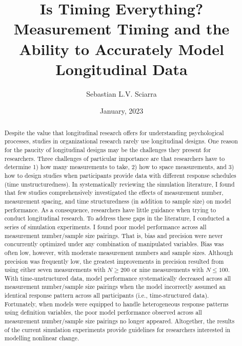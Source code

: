 \documentclass[
12pt, %
twoside,
english]{guelphthesis}
\title{Is Timing Everything? Measurement Timing and the Ability to Accurately Model Longitudinal Data}
\author{Sebastian L.V. Sciarra}
\date{January, 2023}
\let\cleardoublepage\clearpage
\let\oldfrontmatter\frontmatter
\renewcommand{\frontmatter}{
  \oldfrontmatter
  
  
   \pagestyle{frontmatter} %
}
\begin{document}
\frontmatter %

  \maketitle

\setcounter{page}{2} %

\cleardoublepage
\thispagestyle{empty} %
  \begin{abstract}{2}{Despite the value that longitudinal research offers for understanding psychological processes, studies in organizational research rarely use longitudinal designs. One reason for the paucity of longitudinal designs may be the challenges they present for researchers. Three challenges of particular importance are that researchers have to determine 1) how many measurements to take, 2) how to space measurements, and 3) how to design studies when participants provide data with different response schedules (time unstructuredness). In systematically reviewing the simulation literature, I found that few studies comprehensively investigated the effects of measurement number, measurement spacing, and time structuredness (in addition to sample size) on model performance. As a consequence, researchers have little guidance when trying to conduct longitudinal research. To address these gaps in the literature, I conducted a series of simulation experiments. I found poor model performance across all measurement number/sample size pairings. That is, bias and precision were never concurrently optimized under any combination of manipulated variables. Bias was often low, however, with moderate measurement numbers and sample sizes. Although precision was frequently low, the greatest improvements in precision resulted from using either seven measurements with \(N \ge 200\) or nine measurements with \(N \le 100\). With time-unstructured data, model performance systematically decreased across all measurement number/sample size pairings when the model incorrectly assumed an identical response pattern across all participants (i.e., time-structured data). Fortunately, when models were equipped to handle heterogeneous response patterns using definition variables, the poor model performance observed across all measurement number/sample size pairings no longer appeared. Altogether, the results of the current simulation experiments provide guidelines for researchers interested in modelling nonlinear change.}  %

  \end{abstract}
\end{document}
